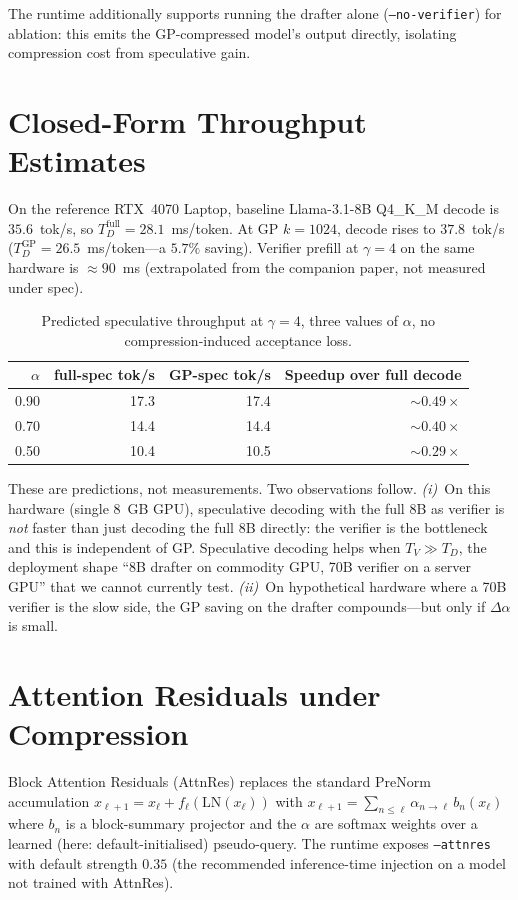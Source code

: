 \documentclass[11pt]{article}
\begin{document}
The runtime additionally supports running the drafter alone
(\texttt{--no-verifier}) for ablation: this emits the GP-compressed
model's output directly, isolating compression cost from speculative
gain.

\section{Closed-Form Throughput Estimates}
\label{sec:closedform}
On the reference RTX~4070 Laptop, baseline Llama-3.1-8B Q4\_K\_M decode
is $35.6$~tok/s, so $T_D^\text{full}{=}28.1$~ms/token.  At GP
$k{=}1024$, decode rises to $37.8$~tok/s
($T_D^\text{GP}{=}26.5$~ms/token---a $5.7\%$ saving).  Verifier prefill
at $\gamma{=}4$ on the same hardware is $\approx 90$~ms (extrapolated
from the companion paper, not measured under spec).

\begin{table}[h]\centering\small
\caption{Predicted speculative throughput at $\gamma{=}4$, three values
of $\alpha$, no compression-induced acceptance loss.}
\begin{tabular}{@{}rrrr@{}}
\toprule
$\alpha$ & full-spec tok/s & GP-spec tok/s & Speedup over full decode \\
\midrule
0.90 & 17.3 & 17.4 & $\sim 0.49\times$ \\
0.70 & 14.4 & 14.4 & $\sim 0.40\times$ \\
0.50 & 10.4 & 10.5 & $\sim 0.29\times$ \\
\bottomrule
\end{tabular}
\end{table}

These are predictions, not measurements.  Two observations follow.
\emph{(i)}~On this hardware (single 8~GB GPU), speculative decoding with
the full 8B as verifier is \emph{not} faster than just decoding the full
8B directly: the verifier is the bottleneck and this is independent of
GP.  Speculative decoding helps when $T_V\gg T_D$, the deployment shape
``8B drafter on commodity GPU, 70B verifier on a server GPU'' that we
cannot currently test.  \emph{(ii)}~On hypothetical hardware where a 70B
verifier is the slow side, the GP saving on the drafter compounds---but
only if $\Delta\alpha$ is small.

\section{Attention Residuals under Compression}
\label{sec:attnres}
Block Attention Residuals (AttnRes) replaces the standard PreNorm
accumulation $x_{\ell+1}=x_\ell+f_\ell(\mathrm{LN}(x_\ell))$ with
\(x_{\ell+1}=\sum_{n\leq\ell}\alpha_{n\to\ell}\,b_n(x_\ell)\) where $b_n$
is a block-summary projector and the $\alpha$ are softmax weights over a
learned (here: default-initialised) pseudo-query.  The runtime exposes
\texttt{--attnres} with default strength $0.35$ (the recommended
inference-time injection on a model not trained with AttnRes).
\end{document}
